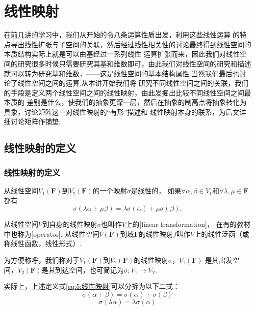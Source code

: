 \chapter{线性映射}

在前几讲的学习中，我们从开始的令八条运算性质出发，利用这些线性运算
的特点导出线性扩张与子空间的关联，然后经过线性相关性的讨论最终得到线性空间的本质结构实际上就是可以由基经过一系列线性
运算扩张而来，因此我们对线性空间的研究很多时候只需要研究其基和维数即可，由此我们对线性空间的研究和描述
就可以转为研究基和维数，——这是线性空间的基本结构属性.当然我们最后也讨论了线性空间之间的运算.从本讲开始我们将
研究不同线性空间之间的关联，我们的手段是定义两个线性空间之间的线性映射，由此发掘出比较不同线性空间之间最本质的
差别是什么，使我们的抽象更深一层，然后在抽象的制高点将抽象转化为具象，讨论矩阵这一对线性映射的``有形''描述和
线性映射本身的联系，为后文详细讨论矩阵作铺垫.

\section{线性映射的定义}
\subsection{线性映射的定义}
\begin{definition}\label{def:3:线性映射的定义}
    从线性空间$V_1(\mathbf{F})$到$V_2(\mathbf{F})$的一个映射$\sigma$是线性的，
    如果$\forall \alpha,\beta \in V_1$和$\forall \lambda,\mu \in \mathbf{F}$都有
    \begin{equation}\label{eq:5:线性映射}
        \sigma(\lambda\alpha+\mu\beta)=\lambda\sigma(\alpha)+\mu\sigma(\beta).
    \end{equation}

    从线性空间$V$到自身的线性映射$\sigma$也叫作$V$上的[linear transformation]，
    在有的教材中也称为[operator].
    从线性空间$V(\mathbf{F})$到域$\mathbf{F}$的线性映射$f$叫作$V$上的线性泛函（或称线性函数，线性形式）.

    为方便称呼，我们称对于$V_1(\mathbf{F})$到$V_2(\mathbf{F})$的线性映射$\sigma$，$V_1(\mathbf{F})$
    是其出发空间，$V_2(\mathbf{F})$是其到达空间，也可简记为$\sigma: V_1\to V_2$.
\end{definition}
实际上，上述定义式\eqref{eq:5:线性映射}可以分拆为以下二式：
\begin{equation} \tag{加性} %
    \sigma(\alpha+\beta)=\sigma(\alpha)+\sigma(\beta)
\end{equation}
\begin{equation} \tag{齐次性}
    \sigma(\lambda\alpha)=\lambda\sigma(\alpha)
\end{equation}

